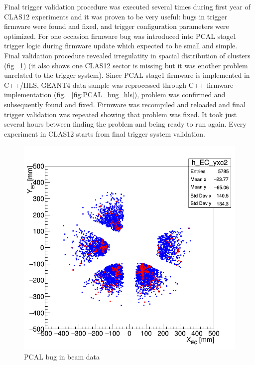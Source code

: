 Final trigger validation procedure was executed several times during first year of CLAS12 experiments and it was proven to be very useful: bugs in trigger firmware were found and fixed, and trigger configuration parameters were optimized.
For one occasion firmware bug was introduced into PCAL stage1 trigger logic during firmware update which expected to be small and simple. Final validation procedure revealed irregulatity in spacial distribution of clusters (fig ~\ref{fig:PCAL_bug_data}) (it also shows one CLAS12 sector is missing but it was enother problem unrelated to the trigger system). Since PCAL stage1 firmware is implemented in C++/HLS, GEANT4 data sample was reprocessed through C++ firmware implementation (fig. ~\ref{fig:PCAL_bug_hls}), problem was confirmed and subsequently found and fixed. Firmware was recompiled and reloaded and final trigger validation was repeated showing that problem was fixed. It took just several hours between finding the problem and being ready to run again. Every experiment in CLAS12 starts from final trigger system validation. 

\begin{figure}[hbt]
	\centering
	\includegraphics[width=1.0\columnwidth,keepaspectratio]{img/PCAL_bug_data.png}
	\caption{PCAL bug in beam data}
	\label{fig:PCAL_bug_data}
\end{figure}

